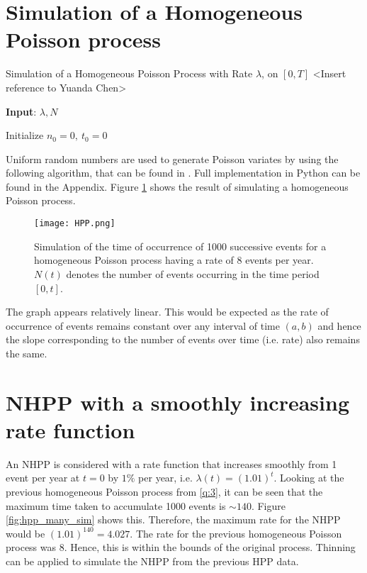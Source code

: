 \documentclass[%
 reprint,
 amsmath,amssymb,
 aps,
]{revtex4-2}
\theoremstyle{definition}
\begin{document}
\section{\label{q:3}Simulation of a Homogeneous Poisson process}

\begin{algorithm}
\label{alg:2}
\caption{Simulation of a Homogeneous Poisson Process with Rate $\lambda$, on $[0, T]$ <Insert reference to Yuanda Chen>}
\textbf{Input}: $\lambda,N$

Initialize $n_0 = 0 ,\  t_0 = 0$\;
\end{algorithm}

Uniform random numbers are used to generate Poisson variates by using the following algorithm, that can be found in \cite{chen}. Full implementation in Python can be found in the Appendix. Figure \ref{fig:hpp} shows the result of simulating a homogeneous Poisson process.

\begin{figure}[H]
\centering
\texttt{[image: HPP.png]}
\caption{\label{fig:hpp}Simulation of the time of occurrence of 1000 successive events for a homogeneous Poisson process having a rate of 8 events per year. $N(t)$ denotes the number of events occurring in the time period $[0,t]$.}
\end{figure}

The graph appears relatively linear. This would be expected as the rate of occurrence of events remains constant over any interval of time $(a,b)$ and hence the slope corresponding to the number of events over time (i.e. rate) also remains the same.

\section{\label{q:4}NHPP with a smoothly increasing rate function}

An NHPP is considered with a rate function that increases smoothly from 1 event per year at $t = 0$ by $1\%$ per year, i.e. $\lambda(t) = (1.01)^t$. Looking at the previous homogeneous Poisson process from \ref{q:3}, it can be seen that the maximum time taken to accumulate 1000 events is $\sim140$. Figure \ref{fig:hpp_many_sim} shows this. Therefore, the maximum rate for the NHPP would be $(1.01)^{140} = 4.027$. The rate for the previous homogeneous Poisson process was 8. Hence, this is within the bounds of the original process. Thinning can be applied to simulate the NHPP from the previous HPP data.
\end{document}
